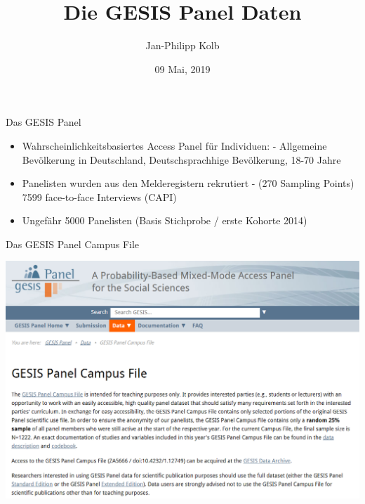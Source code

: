 \documentclass[ignorenonframetext,]{beamer}
\title{Die GESIS Panel Daten}
\author{Jan-Philipp Kolb}
\date{09 Mai, 2019}
\providecommand{\tightlist}{%
  \setlength{\itemsep}{0pt}\setlength{\parskip}{0pt}}
\begin{document}
\frame{\titlepage}

\begin{frame}{Das GESIS Panel}

\begin{itemize}
\tightlist
\item
  Wahrscheinlichkeitsbasiertes Access Panel für Individuen: - Allgemeine
  Bevölkerung in Deutschland, Deutschsprachhige Bevölkerung, 18-70 Jahre
\item
  Panelisten wurden aus den Melderegistern rekrutiert - (270 Sampling
  Points) 7599 face-to-face Interviews (CAPI)
\item
  Ungefähr 5000 Panelisten (Basis Stichprobe / erste Kohorte 2014)
\end{itemize}

\end{frame}

\begin{frame}{Das GESIS Panel Campus File}

\includegraphics{figure/gpdata.PNG}

\end{frame}
\end{document}
